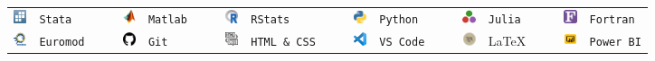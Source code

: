 %
%


\vspace{1.5 mm}

\begin{tabular}{rlrrrlrrrlrrrlrrrlrrrl}
	\includegraphics[width=0.15in,height=0.15in]{icon/stata.jpg}  		&   \texttt{Stata}  	& & & \includegraphics[width=0.15in,height=0.15in]{icon/matlab.jpg}	 & \texttt{Matlab} & & & 
	\includegraphics[width=0.15in,height=0.15in]{icon/r.jpg} 					& 	\texttt{RStats} 				& & & \includegraphics[width=0.15in,height=0.15in]{icon/python.jpg}	 & \texttt{Python} & & &
	\includegraphics[width=0.15in,height=0.15in]{icon/julia.jpg}  		&   \texttt{Julia}  	& & & \includegraphics[width=0.15in,height=0.15in]{icon/fortran.jpg} & \texttt{Fortran} \\ 
	\includegraphics[width=0.15in,height=0.15in]{icon/euromod.jpg} 		& 	\texttt{Euromod}					 	& & & \includegraphics[width=0.15in,height=0.15in]{icon/github.jpg}	 & \texttt{Git} & & &
	\includegraphics[width=0.15in,height=0.15in]{icon/htmlcss.png} 				& 	\texttt{HTML \& CSS}					 	& & & \includegraphics[width=0.15in,height=0.15in]{icon/vscode.jpg}	 & \texttt{VS Code} & & &
	\includegraphics[width=0.15in,height=0.15in]{icon/tex.jpg} 				& 	\LaTeX					 	& & & \includegraphics[width=0.15in,height=0.15in]{icon/powerbi.png}	 & \texttt{Power BI} \\
	
	
\end{tabular}
	
\vspace{3 mm}
